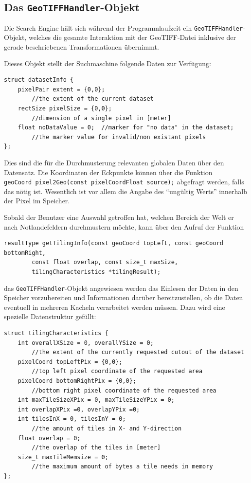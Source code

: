 \documentclass[10pt,a4paper]{report}
\begin{document}
\subsection{Das \texttt{GeoTIFFHandler}-Objekt}

Die Search Engine hält sich während der Programmlaufzeit ein \texttt{GeoTIFFHandler}-Objekt, welches die gesamte Interaktion mit der GeoTIFF-Datei inklusive der gerade beschriebenen Transformationen übernimmt.

Dieses Objekt stellt der Suchmaschine folgende Daten zur Verfügung:

\begin{lstlisting}[language=myC]
struct datasetInfo {
	pixelPair extent = {0,0};	
		//the extent of the current dataset
	rectSize pixelSize = {0,0}; 	
		//dimension of a single pixel in [meter]
	float noDataValue = 0;	//marker for "no data" in the dataset;
		//the marker value for invalid/non existant pixels
};	
\end{lstlisting}

Dies sind die für die Durchmusterung relevanten globalen Daten über den Datensatz. Die Koordinaten der Eckpunkte können über die Funktion \\
\verb|geoCoord pixel2Geo(const pixelCoordFloat source);| abgefragt werden, falls das nötig ist. Wesentlich ist vor allem die Angabe des "`ungültig Werts"' innerhalb der Pixel im Speicher.

Sobald der Benutzer eine Auswahl getroffen hat, welchen Bereich der Welt er nach Notlandefeldern durchmustern möchte, kann über den Aufruf der Funktion 
\begin{lstlisting}[language=myC]
resultType getTilingInfo(const geoCoord topLeft, const geoCoord bottomRight,
		const float overlap, const size_t maxSize, 
		tilingCharacteristics *tilingResult);
\end{lstlisting}

das \texttt{GeoTIFFHandler}-Objekt angewiesen werden das Einlesen der Daten in den Speicher vorzubereiten und Informationen darüber bereitzustellen, ob die Daten eventuell in mehreren Kacheln verarbeitet werden müssen. Dazu wird eine spezielle Datenstruktur gefüllt:
\begin{lstlisting}[language=myC]
struct tilingCharacteristics {
	int overallXSize = 0, overallYSize = 0;	
		//the extent of the currently requested cutout of the dataset
	pixelCoord topLeftPix = {0,0};	
		//top left pixel coordinate of the requested area
	pixelCoord bottomRightPix = {0,0};	
		//bottom right pixel coordinate of the requested area
	int maxTileSizeXPix = 0, maxTileSizeYPix = 0;
	int overlapXPix =0, overlapYPix =0;
	int tilesInX = 0, tilesInY = 0;	
		//the amount of tiles in X- and Y-direction
	float overlap = 0;	
		//the overlap of the tiles in [meter]
	size_t maxTileMemsize = 0;	
		//the maximum amount of bytes a tile needs in memory
};
\end{lstlisting}
\end{document}
